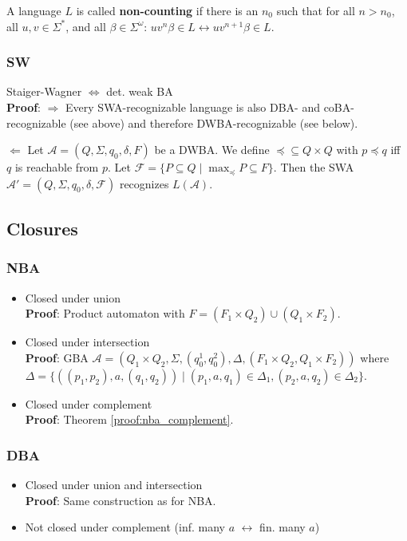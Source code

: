 \documentclass{article}
\begin{document}
A language $L$ is called \textbf{non-counting} if there is an $n_0$ such that for all $n > n_0$, all $u, v \in \Sigma^*$, and all $\beta \in \Sigma^\omega$: $uv^n\beta \in L \leftrightarrow uv^{n+1}\beta \in L$.

\subsubsection{SW}
Staiger-Wagner $\Leftrightarrow$ det. weak BA \\
\textbf{Proof}: $\bm{\Rightarrow}$ Every SWA-recognizable language is also DBA- and coBA-recognizable (see above) and therefore DWBA-recognizable (see below).

$\bm{\Leftarrow}$ Let $\mathcal{A} = (Q, \Sigma, q_0, \delta, F)$ be a DWBA. We define $\preceq \subseteq Q \times Q$ with $p \preceq q$ iff $q$ is reachable from $p$. Let $\mathcal{F} = \{ P \subseteq Q \mid \max_\preceq P \subseteq F \}$. Then the SWA $\mathcal{A}' = (Q, \Sigma, q_0, \delta, \mathcal{F})$ recognizes $L(\mathcal{A})$.

\subsection{Closures}
\subsubsection{NBA}
\begin{itemize}
	\item Closed under union \\
    	\textbf{Proof}: Product automaton with $F = (F_1 \times Q_2) \cup (Q_1 \times F_2)$.
    \item Closed under intersection \\
    	\textbf{Proof}: GBA $\mathcal{A} = (Q_1 \times Q_2, \Sigma, (q_0^1, q_0^2), \Delta, (F_1 \times Q_2, Q_1 \times F_2))$ where \\
    	$\Delta = \{ ((p_1, p_2), a, (q_1, q_2)) \mid (p_1, a, q_1) \in \Delta_1, (p_2, a, q_2) \in \Delta_2 \}$.
    \item Closed under complement \\
    	\textbf{Proof}: Theorem \ref{proof:nba_complement}.
\end{itemize}

\subsubsection{DBA}
\begin{itemize}
	\item Closed under union and intersection \\
		\textbf{Proof}: Same construction as for NBA.
	\item Not closed under complement (inf. many $a$ $\leftrightarrow$ fin. many $a$)
\end{itemize}
\end{document}
